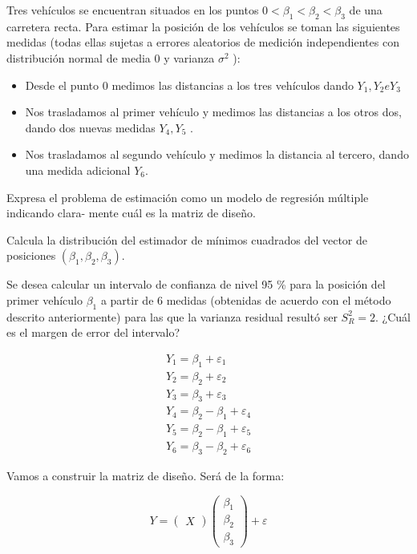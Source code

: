 \begin{problem}[14]
Tres vehículos se encuentran situados en los puntos $0 < β_1 < β_2 < β_3$ de una carretera recta. Para estimar la posición de los vehículos se toman las siguientes medidas (todas ellas sujetas a errores aleatorios de medición independientes con distribución normal de media $0$ y varianza $σ^2$ ):

\begin{itemize}
	\item Desde el punto $0$ medimos las distancias a los tres vehículos dando $Y_1 , Y_2 e Y_3$
	\item Nos trasladamos al primer vehículo y medimos las distancias a los otros dos, dando dos
nuevas medidas $Y_4,Y_5$ .
	\item Nos trasladamos al segundo vehículo y medimos la distancia al tercero, dando una medida
adicional $Y_6$.
\end{itemize}

\spart Expresa el problema de estimación como un modelo de regresión múltiple indicando clara-
mente cuál es la matriz de diseño.

\spart Calcula la distribución del estimador de mínimos cuadrados del vector de posiciones $(β_1 , β_2 , β_3 )$.


\spart Se desea calcular un intervalo de confianza de nivel 95 \% para la posición del primer vehículo $β_1$ a partir de $6$ medidas (obtenidas de acuerdo con el método descrito anteriormente) para las que la varianza residual resultó ser $S_R^2 = 2$. ¿Cuál es el margen de error del intervalo?

\solution


\ppart 

\begin{gather*}
Y_1 = β_1 + ε_1\\
Y_2 = β_2 + ε_2\\
Y_3 = β_3 + ε_3\\
Y_4 = β_2 - β_1 + ε_4\\
Y_5 = β_2 - β_1 + ε_5\\
Y_6 = β_3 - β_2 + ε_6
\end{gather*}

Vamos a construir la matriz de diseño. Será de la forma:

\[
Y = \begin{pmatrix} X \end{pmatrix}\begin{pmatrix}β_1\\β_2\\β_3\end{pmatrix} + ε
\]


\end{problem}
